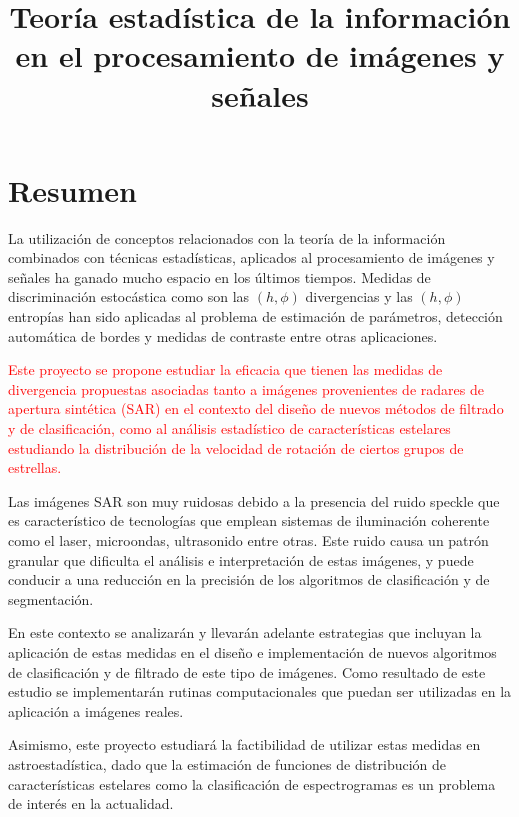 \documentclass[11pt]{article}
\title{\textbf{Teoría estadística de la información \\en el procesamiento de imágenes y señales}}
\date{}
\begin{document}
	
	\maketitle

\section{Resumen}
La utilización de conceptos relacionados con la teoría de la información combinados con técnicas estadísticas, aplicados al procesamiento de imágenes y señales ha ganado mucho espacio en los últimos tiempos. Medidas de discriminación estocástica como son las $(h,\phi)$ divergencias y las $(h,\phi)$ entropías han sido aplicadas al problema de estimación de parámetros, detección automática de bordes y medidas de contraste entre otras aplicaciones. 

\textcolor{red}{Este proyecto se propone estudiar la eficacia que tienen las medidas de divergencia propuestas asociadas tanto a imágenes provenientes de radares de apertura sintética (SAR) en el contexto del diseño de nuevos métodos de filtrado y de clasificación, como al análisis estadístico de características estelares estudiando la distribución de la velocidad de rotación de ciertos grupos de estrellas. }


Las imágenes SAR son muy ruidosas debido a la presencia del ruido speckle que es característico de tecnologías que emplean sistemas de iluminación coherente como el laser, microondas, ultrasonido entre otras. Este ruido causa un patrón granular que dificulta el análisis e interpretación de estas imágenes, y puede conducir a una reducción en la precisión de los algoritmos de clasificación y de segmentación. 

En este contexto se analizarán y llevarán adelante estrategias que incluyan la aplicación de estas medidas en el diseño e implementación de nuevos algoritmos de clasificación y de filtrado de este tipo de imágenes. Como resultado de este estudio se implementarán rutinas computacionales que puedan ser utilizadas en la aplicación a imágenes reales.

Asimismo, este proyecto estudiará la factibilidad de utilizar estas medidas en astroestadística,  dado que la estimación de funciones de distribución de características estelares como la clasificación de espectrogramas es un problema de interés en la actualidad.



\end{document}
